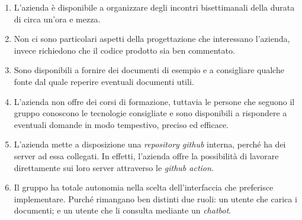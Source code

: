 \begin{enumerate}
	\item L'azienda è disponibile a organizzare degli incontri bisettimanali
		della durata di circa un'ora e mezza.

	\item Non ci sono particolari aspetti della progettazione che interessano
		l'azienda, invece richiedono che il codice prodotto sia ben
		commentato.

	\item Sono disponibili a fornire dei documenti di esempio e a consigliare
		qualche fonte dal quale reperire eventuali documenti utili.

	\item L'azienda non offre dei corsi di formazione, tuttavia le persone che
		seguono il gruppo conoscono le tecnologie consigliate e sono disponibili
		a rispondere a eventuali domande in modo tempestivo, preciso ed
		efficace.

	\item L'azienda mette a disposizione una \textit{repository github} interna, 
		perché ha dei server ad essa collegati. In effetti, l'azienda offre la
		possibilità di lavorare direttamente sui loro server attraverso le
		\textit{github action}.

	\item Il gruppo ha totale autonomia nella scelta dell'interfaccia che
		preferisce implementare. Purché rimangano ben distinti due ruoli: 
		un utente che carica i documenti; e un utente che li consulta mediante un
		\textit{chatbot}.
\end{enumerate}